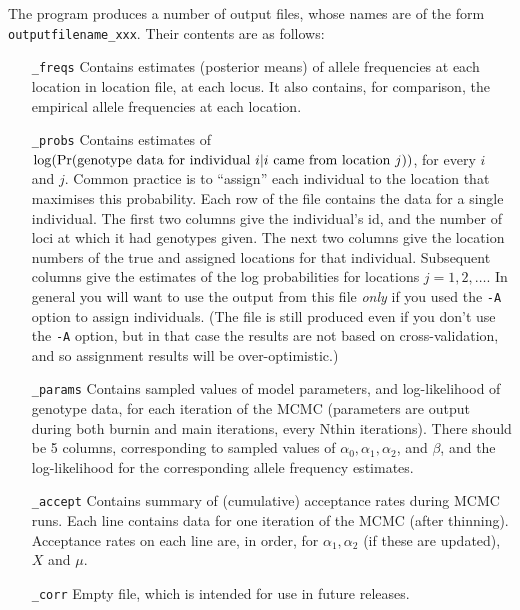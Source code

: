 \documentclass[11pt,titlepage,times,letterpaper]{article}
\def \Pr{{\rm Pr}}
\begin{document}
The program produces a number of output files,
whose names are of the form {\tt outputfilename\_xxx}. Their
contents are as follows:
\begin{enumerate}[\_params]
\item[{\tt \_freqs}] Contains estimates (posterior means) of allele
frequencies at each location in location file, at each locus. It also contains,
for comparison, the empirical allele frequencies at each location.
\item[{\tt \_probs}] Contains estimates of $\log(\Pr(\text{genotype
data for individual $i$} | \text{$i$ came from location $j$}))$, for
every $i$ and $j$. Common practice is to ``assign'' each individual
to the location that maximises this probability. Each row of the file
contains the data for a single individual. The first two columns give
the individual's id, and the number of loci at which it had genotypes
given. The next two columns give the location numbers of the
true and assigned locations for that individual.
Subsequent columns give the estimates of the log
probabilities for locations $j=1,2,\dots$. In general you will want to
use the output from this file {\it only} if you used the {\tt -A}
option to assign individuals. (The file is still produced even if you
don't use the {\tt -A} option, but in that case the results are not
based on cross-validation, and so assignment results will be
over-optimistic.)
\item[{\tt \_params}] Contains sampled values of model parameters, and
log-likelihood of genotype data, for each iteration of the MCMC
(parameters are output during both burnin and main iterations, every
Nthin iterations). There should be 5 columns, corresponding to sampled
values of $\alpha_0,\alpha_1,\alpha_2$, and $\beta$, and the
log-likelihood for the corresponding allele frequency estimates.
\item[{\tt \_accept}] Contains summary of (cumulative) acceptance rates
during MCMC runs. Each line contains data for one iteration of the
MCMC (after thinning). Acceptance rates on each line are, in order,
for $\alpha_1,\alpha_2$ (if these are updated), $X$ and $\mu$.
\item[{\tt \_corr}] Empty file, which is intended for use in future releases.
\end{enumerate}
\end{document}

